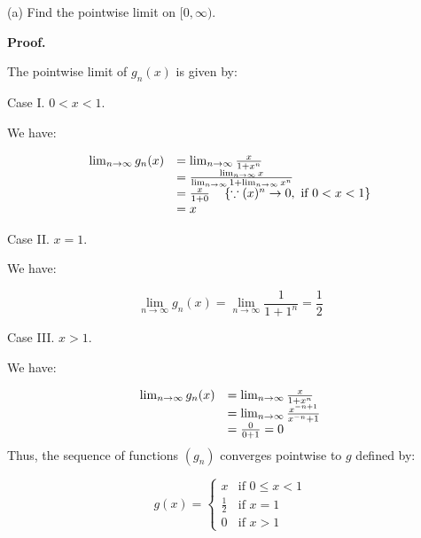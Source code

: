 \documentclass[10pt]{article}
\begin{document}
(a) Find the pointwise limit on $\displaystyle [ 0,\infty )$.



\textbf{Proof.}



The pointwise limit of $\displaystyle g_{n}( x)$ is given by:



Case I. $\displaystyle 0< x< 1$.



We have:


\begin{equation*}
\begin{array}{ c l }
\lim _{n\rightarrow \infty } g_{n}( x) & =\lim _{n\rightarrow \infty }\frac{x}{1+x^{n}}\\
 & =\frac{\lim _{n\rightarrow \infty } x}{\lim _{n\rightarrow \infty } 1+\lim _{n\rightarrow \infty } x^{n}}\\
 & =\frac{x}{1+0} \quad \left\{\because ( x)^{n}\rightarrow 0,\ \text{if } 0< x< 1\right\}\\
 & =x
\end{array}
\end{equation*}


Case II. $\displaystyle x=1$.



We have:


\begin{equation*}
\lim _{n\rightarrow \infty } g_{n}( x) =\lim _{n\rightarrow \infty }\frac{1}{1+1^{n}} =\frac{1}{2}
\end{equation*}


Case III. $\displaystyle x >1$.



We have:




\begin{equation*}
\begin{array}{ c l }
\lim _{n\rightarrow \infty } g_{n}( x) & =\lim _{n\rightarrow \infty }\frac{x}{1+x^{n}}\\
 & =\lim _{n\rightarrow \infty }\frac{x^{-n+1}}{x^{-n} +1}\\
 & =\frac{0}{0+1} =0
\end{array}
\end{equation*}
Thus, the sequence of functions $\displaystyle ( g_{n})$ converges pointwise to $\displaystyle g$ defined by:


\begin{equation*}
g( x) =\begin{cases}
x & \text{if } 0\leq x< 1\\
\frac{1}{2} & \text{if } x=1\\
0 & \text{if } x >1
\end{cases}
\end{equation*}
\end{document}
